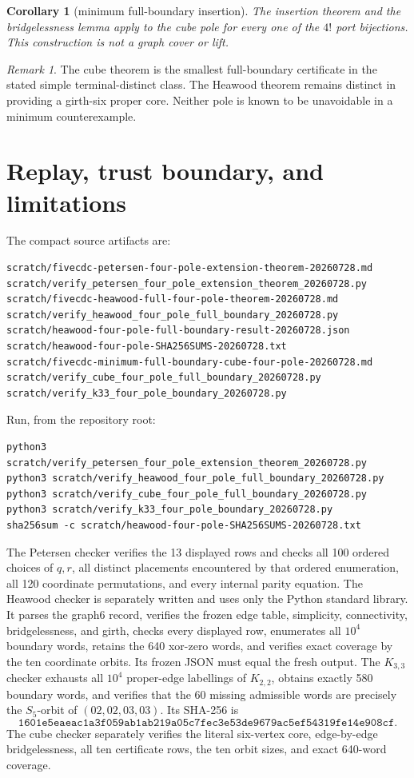 \documentclass[11pt]{article}
\newtheorem{corollary}[theorem]{Corollary}
\theoremstyle{definition}
\theoremstyle{remark}
\newtheorem{remark}[theorem]{Remark}
\begin{document}
\begin{corollary}[minimum full-boundary insertion]
The insertion theorem and the bridgelessness lemma apply to the cube pole
for every one of the \(4!\) port bijections.  This construction is not a
graph cover or lift.
\end{corollary}

\begin{remark}
The cube theorem is the smallest full-boundary certificate in the stated
simple terminal-distinct class.  The Heawood theorem remains distinct in
providing a girth-six proper core.  Neither pole is known to be unavoidable
in a minimum counterexample.
\end{remark}

\section{Replay, trust boundary, and limitations}\label{sec:replay}

The compact source artifacts are:
\begin{verbatim}
scratch/fivecdc-petersen-four-pole-extension-theorem-20260728.md
scratch/verify_petersen_four_pole_extension_theorem_20260728.py
scratch/fivecdc-heawood-full-four-pole-theorem-20260728.md
scratch/verify_heawood_four_pole_full_boundary_20260728.py
scratch/heawood-four-pole-full-boundary-result-20260728.json
scratch/heawood-four-pole-SHA256SUMS-20260728.txt
scratch/fivecdc-minimum-full-boundary-cube-four-pole-20260728.md
scratch/verify_cube_four_pole_full_boundary_20260728.py
scratch/verify_k33_four_pole_boundary_20260728.py
\end{verbatim}
Run, from the repository root:
\begin{verbatim}
python3 scratch/verify_petersen_four_pole_extension_theorem_20260728.py
python3 scratch/verify_heawood_four_pole_full_boundary_20260728.py
python3 scratch/verify_cube_four_pole_full_boundary_20260728.py
python3 scratch/verify_k33_four_pole_boundary_20260728.py
sha256sum -c scratch/heawood-four-pole-SHA256SUMS-20260728.txt
\end{verbatim}

The Petersen checker verifies the 13 displayed rows and checks all 100
ordered choices of \(q,r\), all distinct placements encountered by that
ordered enumeration, all 120 coordinate permutations, and every internal
parity equation.  The Heawood checker is separately written and uses only
the Python standard library.  It parses the graph6 record, verifies the
frozen edge table, simplicity, connectivity, bridgelessness, and girth,
checks every displayed row, enumerates all \(10^4\) boundary words, retains
the 640 xor-zero words, and verifies exact coverage by the ten coordinate
orbits.  Its frozen JSON must equal the fresh output.
The \(K_{3,3}\) checker exhausts all \(10^4\) proper-edge labellings of
\(K_{2,2}\), obtains exactly 580 boundary words, and verifies that the
60 missing admissible words are precisely the \(S_5\)-orbit of
\((02,02,03,03)\).  Its SHA-256 is
\[
\texttt{1601e5eaeac1a3f059ab1ab219a05c7fec3e53de9679ac5ef54319fe14e908cf}.
\]
The cube checker separately verifies the literal six-vertex core,
edge-by-edge bridgelessness, all ten certificate rows, the ten orbit sizes,
and exact 640-word coverage.
\end{document}
